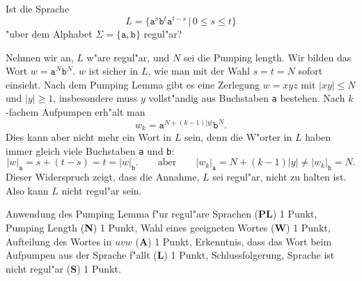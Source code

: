 Ist die Sprache
\[
L=\{
\texttt{a}^s
\texttt{b}^t
\texttt{a}^{t-s}
\,|\, 0\le s\le t
\}
\]
"uber dem Alphabet $\Sigma=\{\texttt{a},\texttt{b}\}$ regul"ar?

\begin{loesung}
Nehmen wir an, $L$ w"are regul"ar, und $N$ sei die Pumping length. 
Wir bilden das Wort $w=\texttt{a}^N\texttt{b}^N$. $w$ ist sicher in $L$,
wie man mit der Wahl $s=t=N$ sofort einsieht. 
Nach dem Pumping Lemma gibt es eine Zerlegung $w=xyz$ mit $|xy|\le N$
und $|y|\ge 1$,
insbesondere muss $y$ vollst"andig aus Buchstaben \texttt{a} bestehen.
Nach $k$-fachem Aufpumpen erh"alt man
\[
w_k=\texttt{a}^{N+(k-1)|y|}\texttt{b}^N.
\]
Dies kann aber nicht mehr ein Wort in $L$ sein, denn die W"orter in $L$
haben immer gleich viele Buchstaben \texttt{a} und \texttt{b}:
\[
|w|_{\texttt{a}}
=s+(t-s)=t=
|w|_{\texttt{b}}.
\qquad\text{aber}\qquad
|w_k|_{\texttt{a}}
=N+(k-1)|y|\ne
|w_k|_{\texttt{b}}=N.
\]
Dieser Widerspruch zeigt, dass die Annahme, $L$ sei regul"ar, nicht zu
halten ist. Also kann $L$ nicht regul"ar sein.
\end{loesung}

\begin{bewertung}
Anwendung des Pumping Lemma f"ur regul"are Sprachen ({\bf PL}) 1 Punkt,
Pumping Length ({\bf N}) 1 Punkt,
Wahl eines geeigneten Wortes ({\bf W}) 1 Punkt,
Aufteilung des Wortes in $uvw$ ({\bf A}) 1 Punkt,
Erkenntnis, dass das Wort beim Aufpumpen aus der Sprache f"allt ({\bf L})
1 Punkt,
Schlussfolgerung, Sprache ist nicht regul"ar ({\bf S}) 1 Punkt.
\end{bewertung}

